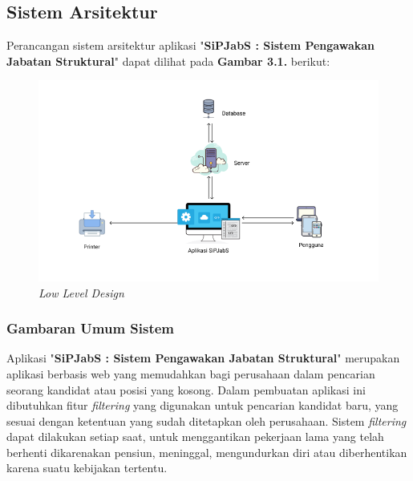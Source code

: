 \chapter{\babTiga}

\section{Sistem Arsitektur}

Perancangan sistem arsitektur aplikasi "\textbf{SiPJabS : Sistem Pengawakan Jabatan Struktural}" dapat dilihat pada \textbf{Gambar 3.1.} berikut: 

\begin{figure}
	\centering
	\includegraphics[width=1.1\textwidth]
	{pics/LowLevelDiagram.png}
	\caption{\textit{Low Level Design}}
	\label{fig:31}
\end{figure}


\subsection{Gambaran Umum Sistem}

Aplikasi "\textbf{SiPJabS : Sistem Pengawakan Jabatan Struktural}" merupakan aplikasi berbasis web yang memudahkan bagi perusahaan dalam pencarian seorang kandidat atau posisi yang kosong. Dalam pembuatan aplikasi ini dibutuhkan fitur \textit{filtering} yang digunakan untuk pencarian kandidat baru, yang sesuai dengan ketentuan yang sudah ditetapkan oleh perusahaan. Sistem \textit{filtering} dapat dilakukan setiap saat, untuk menggantikan pekerjaan lama yang telah berhenti dikarenakan pensiun, meninggal, mengundurkan diri atau diberhentikan karena suatu kebijakan tertentu. \\

